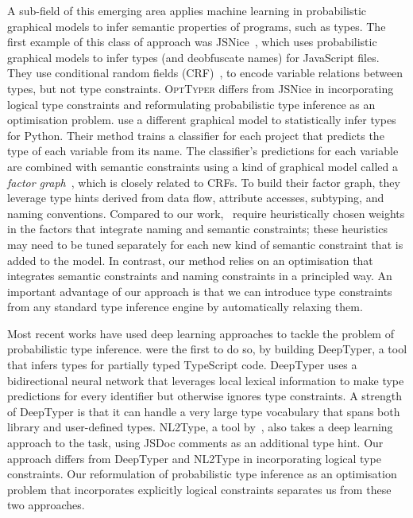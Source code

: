 \documentclass[acmsmall, review, anonymous]{acmart}\settopmatter{printfolios=true,printccs=false,printacmref=false}
\newcommand{\projectname}{\textsc{OptTyper}\xspace}
\begin{document}
A sub-field of this emerging area applies machine learning in probabilistic graphical models to infer semantic properties of programs, such as types.
The first example of this class
of approach was
JSNice~\citep{raychev15}, which uses probabilistic graphical models to infer types (and deobfuscate names) for JavaScript files. 
They use conditional random fields (CRF)~\cite{sutton12}, to encode variable relations between types, but not type constraints. 
\projectname differs from JSNice in incorporating logical type constraints and reformulating  probabilistic type inference as an optimisation problem.
\citet{xu16} use a different  graphical model to statistically infer types for Python. 
Their method trains a
classifier for each project that predicts the
type of each variable from its name.
The classifier's predictions for each variable are combined with semantic constraints using a kind of graphical model called a \emph{factor graph}~\citep{yedidia2003}, which is
closely related to CRFs.
To build their factor graph, they leverage type hints
derived from data flow, attribute accesses, subtyping, and naming conventions. Compared to our work,~\citet{xu16} require
heuristically chosen weights in the factors that integrate naming and semantic constraints; these heuristics may need to be tuned separately for each new kind of semantic constraint that is added to the model. In contrast, our method relies on an optimisation that integrates semantic constraints
and naming constraints in a principled way.
An important advantage of our approach
is that we can introduce type constraints from any standard type inference engine by automatically relaxing them.

Most recent works have used deep learning approaches to tackle
the problem of probabilistic type inference.
\citet{hellendoorn18} were the first to do so, by building 
DeepTyper, a tool that infers types for partially typed TypeScript code. DeepTyper uses a bidirectional neural network that leverages local lexical information to make type predictions for every identifier but otherwise ignores type constraints. 
A strength of DeepTyper is that it can handle a very large type vocabulary that spans both library and user-defined types.
NL2Type, a tool by~\cite{malik19}, also takes
a deep learning approach to the task, using JSDoc comments as an additional type hint.
Our approach differs from DeepTyper and NL2Type in  incorporating logical type constraints.
Our reformulation of probabilistic type inference as an optimisation problem that incorporates explicitly logical constraints separates us from these two approaches.
\end{document}
